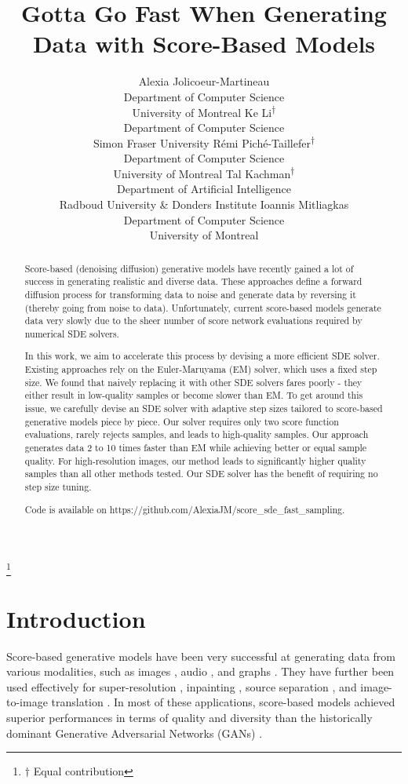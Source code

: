 \documentclass{article}
\title{Gotta Go Fast When Generating Data with Score-Based Models}
\author{
 Alexia Jolicoeur-Martineau\\
 Department of Computer Science\\
 University of Montreal
 \And 
 Ke Li\textsuperscript{$\dagger$} \\
 Department of Computer Science\\
 Simon Fraser University
 \And 
 Rémi Piché-Taillefer\textsuperscript{$\dagger$} \\
 Department of Computer Science\\
 University of Montreal
 \And 
 Tal Kachman\textsuperscript{$\dagger$} \\
 Department of Artificial Intelligence \\
 Radboud University \& Donders Institute
\And
 Ioannis Mitliagkas \\
 Department of Computer Science\\
 University of Montreal
}
\newcommand\blfootnote[1]{\begingroup
  \renewcommand\thefootnote{}\footnote{#1}\addtocounter{footnote}{-1}\endgroup
}
\begin{document}
\blfootnote{$\dagger$ Equal contribution}

\maketitle

\begin{abstract}

   Score-based (denoising diffusion) generative models have recently gained a lot of success in generating realistic and diverse data. These approaches define a forward diffusion process for transforming data to noise and generate data by reversing it (thereby going from noise to data). Unfortunately, current score-based models generate data very slowly due to the sheer number of score network evaluations required by numerical SDE solvers. 
   
   In this work, we aim to accelerate this process by devising a more efficient SDE solver. Existing approaches rely on the Euler-Maruyama (EM) solver, which uses a fixed step size. We found that naively replacing it with other SDE solvers fares poorly - they either result in low-quality samples or become slower than EM. To get around this issue, we carefully devise an SDE solver with adaptive step sizes tailored to score-based generative models piece by piece. Our solver requires only two score function evaluations, rarely rejects samples, and leads to high-quality samples. Our approach generates data 2 to 10 times faster than EM while achieving better or equal sample quality. For high-resolution images, our method leads to significantly higher quality samples than all other methods tested. Our SDE solver has the benefit of requiring no step size tuning.
   
   Code is available on https://github.com/AlexiaJM/score\_sde\_fast\_sampling.
 
\end{abstract}

\section{Introduction}

Score-based generative models \citep{song2019generative, song2020improved, ho2020denoising, jolicoeur2020adversarial, song2020score, hmc2021remipt} have been very successful at generating data from various modalities, such as images \citep{ho2020denoising, song2020score}, audio \citep{chen2020wavegrad,kong2020diffwave, mittal2021symbolic, kameoka2020voicegrad}, and graphs \citep{niu2020permutation}. They have further been used effectively for super-resolution \citep{saharia2021image,kadkhodaie2020solving}, inpainting \citep{kadkhodaie2020solving, song2020improved}, source separation \citep{jayaram2020source}, and image-to-image translation \citep{sasaki2021unit}. In most of these applications, score-based models achieved superior performances in terms of quality and diversity than the historically dominant Generative Adversarial Networks (GANs) \citep{GAN}.
\end{document}
